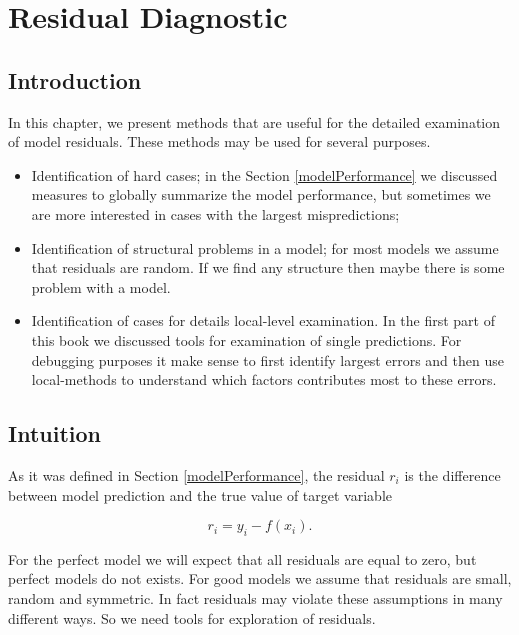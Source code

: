 \documentclass[12pt,]{krantz}
\providecommand{\tightlist}{%
  \setlength{\itemsep}{0pt}\setlength{\parskip}{0pt}}
\begin{document}
\hypertarget{residualDiagnostic}{%
\section{Residual Diagnostic}\label{residualDiagnostic}}

\hypertarget{introduction-2}{%
\subsection{Introduction}\label{introduction-2}}

In this chapter, we present methods that are useful for the detailed examination of model residuals. These methods may be used for several purposes.

\begin{itemize}
\tightlist
\item
  Identification of hard cases; in the Section \ref{modelPerformance} we discussed measures to globally summarize the model performance, but sometimes we are more interested in cases with the largest mispredictions;
\item
  Identification of structural problems in a model; for most models we assume that residuals are random. If we find any structure then maybe there is some problem with a model.
\item
  Identification of cases for details local-level examination. In the first part of this book we discussed tools for examination of single predictions. For debugging purposes it make sense to first identify largest errors and then use local-methods to understand which factors contributes most to these errors.
\end{itemize}

\hypertarget{intuition}{%
\subsection{Intuition}\label{intuition}}

As it was defined in Section \ref{modelPerformance}, the residual \(r_i\) is the difference between model prediction and the true value of target variable

\[
r_i = y_i - f(x_i).
\]

For the perfect model we will expect that all residuals are equal to zero, but perfect models do not exists.
For good models we assume that residuals are small, random and symmetric. In fact residuals may violate these assumptions in many different ways. So we need tools for exploration of residuals.
\end{document}
